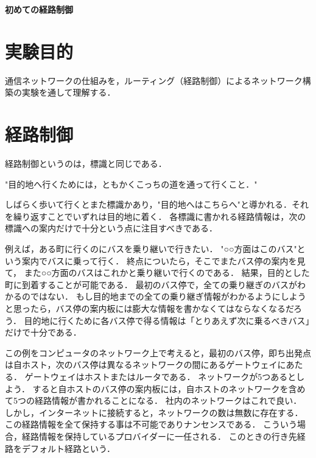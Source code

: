 \documentclass[10pt,a4paper]{jarticle}
\begin{document}
\def\Title{初めての経路制御}
\begin{flushright}{\Huge\bf\Title}\end{flushright}

\section{実験目的}
通信ネットワークの仕組みを，ルーティング（経路制御）によるネットワーク構築の実験を通して理解する．

\section{経路制御} 
経路制御というのは，標識と同じである．

\medskip
\begin{center}
"目的地へ行くためには，ともかくこっちの道を通って行くこと．"
\end{center}
\medskip

しばらく歩いて行くとまた標識かあり，"目的地へはこちらへ"と導かれる．それを繰り返すことでいずれは目的地に着く．
各標識に書かれる経路情報は，次の標識への案内だけで十分という点に注目すべきである．

例えば，ある町に行くのにバスを乗り継いで行きたい．
"○○方面はこのバス"という案内でバスに乗って行く．
終点についたら，そこでまたバス停の案内を見て，
また○○方面のバスはこれかと乗り継いで行くのである．
結果，目的とした町に到着することが可能である．
最初のバス停で，全ての乗り継ぎのバスがわかるのではない．
もし目的地までの全ての乗り継ぎ情報がわかるようにしようと思ったら，バス停の案内板には膨大な情報を書かなくてはならなくなるだろう．
目的地に行くために各バス停で得る情報は「とりあえず次に乗るべきバス」だけで十分である．

この例をコンピュータのネットワーク上で考えると，最初のバス停，即ち出発点は自ホスト，次のバス停は異なるネットワークの間にあるゲートウェイにあたる．
ゲートウェイはホストまたはルータである．
ネットワークが5つあるとしよう．
すると自ホストのバス停の案内板には，自ホストのネットワークを含めて5つの経路情報が書かれることになる．
社内のネットワークはこれで良い．
しかし，インターネットに接続すると，ネットワークの数は無数に存在する．
この経路情報を全て保持する事は不可能でありナンセンスである．
こういう場合，経路情報を保持しているプロバイダーに一任される．
このときの行き先経路をデフォルト経路という．
\end{document}
